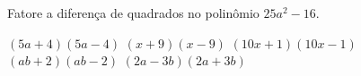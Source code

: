 Fatore a diferença de quadrados no polinômio $25a^2-16$.

$(5a+4)(5a-4)$
$(x+9)(x-9)$
$(10x+1)(10x-1)$
$(ab+2)(ab-2)$
$(2a-3b)(2a+3b)$



